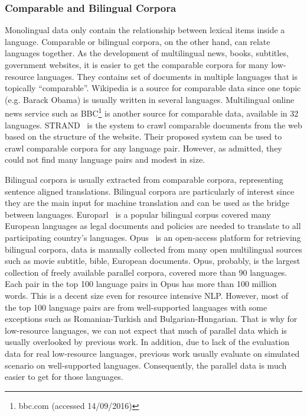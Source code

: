 \documentclass[12pt,twoside,final,hidelinks]{ltthesis}
\theoremstyle{definition}
\begin{document}
\subsubsection{Comparable and Bilingual Corpora}
Monolingual data only contain the relationship between lexical items inside a language. Comparable or bilingual corpora, on the other hand, can relate languages together. 
As the development of multilingual news, books, subtitles, government websites, it is easier to get the comparable corpora for many low-resource languages. They contains set of documents in multiple languages that is topically ``comparable''. Wikipedia is a source for comparable data since one topic (e.g. Barack Obama) is usually written in several languages. Multilingual online news service such as BBC\footnote{bbc.com (accessed 14/09/2016)} is another source for comparable data, available in 32 languages. STRAND~\cite{Resnik:2003:WPC:964751.964753} is the system to crawl comparable documents from the web based on the structure of the website. Their proposed system can be used to crawl comparable corpora for any language pair. However, as admitted, they could not find many language pairs and modest in size. 

Bilingual corpora is usually extracted from comparable corpora, representing sentence 
aligned translations. Bilingual corpora are particularly of interest since they are the 
main input for machine translation and can be used as the bridge between languages. 
Europarl~\cite{europarl} is a popular bilingual corpus covered many European languages 
as legal documents and policies are needed to translate to all 
participating country's languages. Opus~\cite{TIEDEMANN12.463.L12-1246} is an open-access platform 
for retrieving bilingual corpora, data is manually collected from many open
 multilingual sources such as movie subtitle, bible, European documents. Opus, probably,  is the
 largest collection of freely available parallel corpora, covered more than 90 
 languages. Each pair in the top 100 language pairs in Opus has more than 100 million 
 words. This is a decent size even for resource intensive NLP. However, most of the 
 top 100 language pairs are from well-supported languages with some 
 exceptions such as Romanian-Turkish and Bulgarian-Hungarian. That is why for low-resource languages, we can not expect that much of parallel data which is usually overlooked by previous work. 
In addition, due to lack of the 
evaluation data for real low-resource languages, previous work usually evaluate on simulated scenario on well-supported 
languages. Consequently, the parallel data is much easier to get for those languages. 
\end{document}
